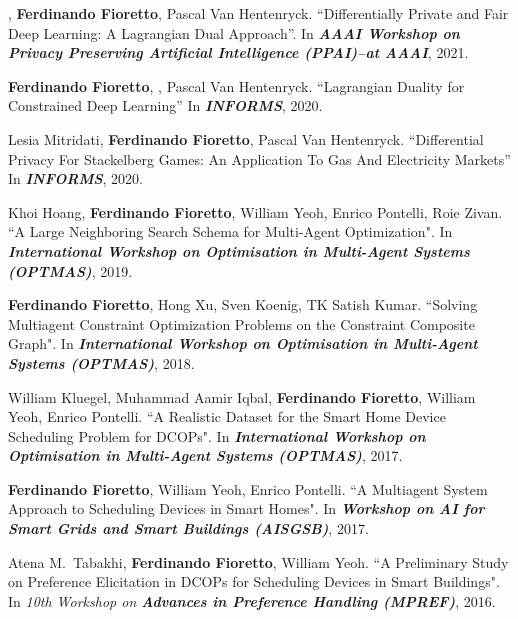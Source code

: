 \item {}, {\bf Ferdinando Fioretto}, Pascal Van 	Hentenryck.
	{``Differentially Private and Fair Deep Learning: A Lagrangian Dual Approach''}.
	In \emph{{\bf AAAI Workshop on Privacy Preserving Artificial Intelligence (PPAI)--at AAAI}}, 2021.

\item {\bf Ferdinando Fioretto}, , Pascal Van Hentenryck.
	{``Lagrangian Duality for Constrained Deep Learning''}
	In \emph{\bf INFORMS}, 2020.

\item Lesia Mitridati, {\bf Ferdinando Fioretto}, Pascal Van Hentenryck.
	{``Differential Privacy For Stackelberg Games: An Application To Gas And Electricity Markets''}
	In \emph{\bf INFORMS}, 2020.

\item 
	Khoi Hoang, {\bf Ferdinando Fioretto}, William Yeoh, Enrico Pontelli, Roie Zivan. 
	{``A Large Neighboring Search Schema for Multi-Agent Optimization"}. 
	In \emph{{\bf International Workshop on Optimisation in Multi-Agent Systems (OPTMAS)}}, 2019.

\item
	{\bf Ferdinando Fioretto}, Hong Xu, Sven Koenig, TK Satish Kumar. 
	{``Solving Multiagent Constraint Optimization Problems on the Constraint Composite Graph"}. 
	In \emph{{\bf International Workshop on Optimisation in Multi-Agent Systems (OPTMAS)}}, 2018.	

\item
	William Kluegel, Muhammad Aamir Iqbal, {\bf Ferdinando Fioretto}, William Yeoh, Enrico Pontelli. 
	{``A Realistic Dataset for the Smart Home Device Scheduling Problem for DCOPs"}.
	In \emph{{\bf International Workshop on Optimisation in Multi-Agent Systems (OPTMAS)}}, 2017.	

\item 
	{\bf Ferdinando Fioretto},  William Yeoh, Enrico Pontelli. 
	{``A Multiagent System Approach to Scheduling Devices in Smart Homes"}.
	In \emph{{\bf Workshop on AI for Smart Grids and Smart Buildings (AISGSB)}}, 2017.
	
\item 
	Atena M.~Tabakhi, {\bf Ferdinando Fioretto}, William Yeoh.
	{``A Preliminary Study on Preference Elicitation in DCOPs for Scheduling Devices in Smart Buildings"}.
	In \emph{10th Workshop on {\bf Advances in Preference Handling (MPREF)}}, 2016. 


